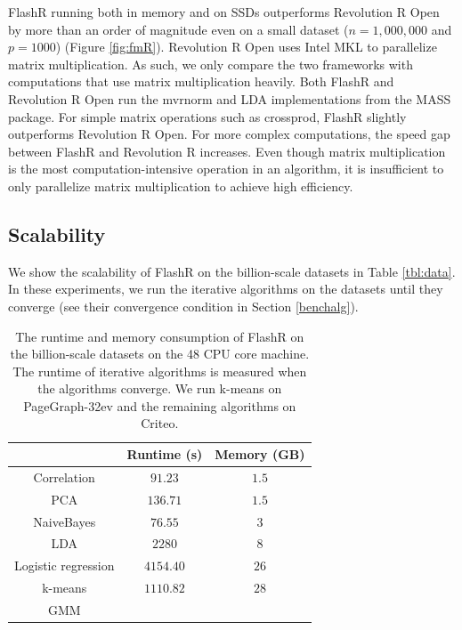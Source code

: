 FlashR running both in memory and on SSDs outperforms Revolution R Open by more
than an order of magnitude even on a small dataset ($n=1,000,000$ and $p=1000$)
(Figure \ref{fig:fmR}).
Revolution R Open uses Intel MKL to parallelize matrix multiplication. As such,
we only compare the two frameworks with computations that use matrix
multiplication heavily. Both FlashR and Revolution R Open run the mvrnorm
and LDA implementations from the MASS package. For simple matrix operations such as crossprod,
FlashR slightly outperforms Revolution R Open. For more complex computations,
the speed gap between FlashR and Revolution R increases. Even though matrix multiplication
is the most computation-intensive operation in an algorithm, it is insufficient
to only parallelize matrix multiplication to achieve high efficiency.

\subsection{Scalability}

We show the scalability of FlashR on the billion-scale datasets in Table
\ref{tbl:data}. In these experiments, we run the iterative algorithms on
the datasets until they converge (see their convergence condition in Section
\ref{benchalg}).

\begin{table}
\begin{center}
	\caption{The runtime and memory consumption of FlashR on the billion-scale
		datasets on the 48 CPU core machine. The runtime of iterative
		algorithms is measured when the algorithms converge. We run k-means
		on PageGraph-32ev and the remaining algorithms on Criteo.}
\vspace{-10pt}
\footnotesize
\begin{tabular}{|c|c|c|}
\hline
	& Runtime (s) & Memory (GB) \\
\hline
Correlation & $91.23$ & $1.5$ \\
\hline
PCA & $136.71$ & $1.5$ \\
\hline
NaiveBayes & $76.55$ & $3$ \\
\hline
LDA & $2280$ & $8$ \\
\hline
Logistic regression & $4154.40$ & $26$ \\
\hline
k-means & $1110.82$ & $28$ \\
\hline
GMM & & \\
\hline
\end{tabular}
\normalsize
\label{tbl:scale}
\end{center}
\vspace{-10pt}
\end{table}

